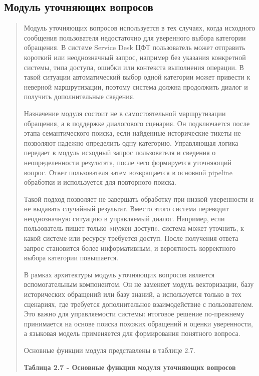 \documentclass[
]{article}
\begin{document}
\hypertarget{ux43cux43eux434ux443ux43bux44c-ux443ux442ux43eux447ux43dux44fux44eux449ux438ux445-ux432ux43eux43fux440ux43eux441ux43eux432}{%
\subsection{Модуль уточняющих
вопросов}\label{ux43cux43eux434ux443ux43bux44c-ux443ux442ux43eux447ux43dux44fux44eux449ux438ux445-ux432ux43eux43fux440ux43eux441ux43eux432}}

\begin{quote}
Модуль уточняющих вопросов используется в тех случаях, когда исходного
сообщения пользователя недостаточно для уверенного выбора категории
обращения. В системе Service Desk ЦФТ пользователь может отправить
короткий или неоднозначный запрос, например без указания конкретной
системы, типа доступа, ошибки или контекста выполнения операции. В такой
ситуации автоматический выбор одной категории может привести к неверной
маршрутизации, поэтому система должна продолжить диалог и получить
дополнительные сведения.

Назначение модуля состоит не в самостоятельной маршрутизации обращения,
а в поддержке диалогового сценария. Он подключается после этапа
семантического поиска, если найденные исторические тикеты не позволяют
надежно определить одну категорию. Управляющая логика передает в модуль
исходный запрос пользователя и сведения о неопределенности результата,
после чего формируется уточняющий вопрос. Ответ пользователя затем
возвращается в основной pipeline обработки и используется для повторного
поиска.

Такой подход позволяет не завершать обработку при низкой уверенности и
не выдавать случайный результат. Вместо этого система переводит
неоднозначную ситуацию в управляемый диалог. Например, если пользователь
пишет только «нужен доступ», система может уточнить, к какой системе или
ресурсу требуется доступ. После получения ответа запрос становится более
информативным, и вероятность корректного выбора категории повышается.

В рамках архитектуры модуль уточняющих вопросов является вспомогательным
компонентом. Он не заменяет модуль векторизации, базу исторических
обращений или базу знаний, а используется только в тех сценариях, где
требуется дополнительное взаимодействие с пользователем. Это важно для
управляемости системы: итоговое решение по-прежнему принимается на
основе поиска похожих обращений и оценки уверенности, а языковая модель
применяется для формирования понятного вопроса.

Основные функции модуля представлены в таблице 2.7.

\textbf{Таблица 2.7 - Основные функции модуля уточняющих вопросов}
\end{quote}
\end{document}
